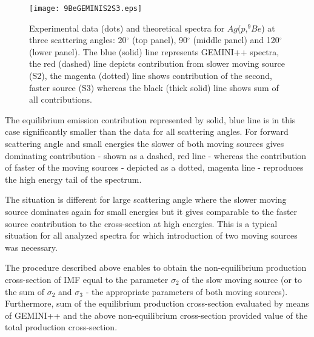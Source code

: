 \begin{figure}[!h]
	\centering
		\texttt{[image: 9BeGEMINIS2S3.eps]}
	\caption{Experimental data (dots) and theoretical spectra for $Ag$($p$,$^{9}Be$) at three
		scattering angles: 20$^{\circ}$ (top panel), 90$^{\circ}$ (middle panel) and 120$^{\circ}$ (lower panel).
		The blue (solid) line represents GEMINI++ spectra, the red (dashed) line depicts contribution
		from slower moving source (S2), the magenta (dotted) line shows contribution of the second, faster
		source (S3) whereas the black (thick solid) line shows sum of all contributions.}
	\label{fig:9BeGEMINIS2S3}
\end{figure}

The equilibrium emission
contribution represented by solid, blue line is in this case
significantly smaller than the data for all scattering angles. For
forward scattering angle and small energies the slower of both
moving sources gives dominating contribution - shown as a dashed,
red line - whereas the contribution of faster of the moving sources
- depicted as a dotted, magenta line - reproduces the high energy
tail of the spectrum.  

The situation is different for large
scattering angle where the slower moving source dominates again for
small energies but it gives comparable to the faster source
contribution to the cross-section at high energies.  This is a
typical situation for all analyzed spectra for which introduction of
two moving sources was necessary.
%

The procedure described above enables to obtain the non-equilibrium
production cross-section of IMF equal to the parameter $\sigma_2$ of
the slow moving source (or to the sum of $\sigma_2$ and $\sigma_3$ -
the appropriate parameters of both moving sources).  Furthermore,
sum of the equilibrium production cross-section evaluated by means
of GEMINI++ and the above non-equilibrium cross-section provided
value of the total production cross-section.


